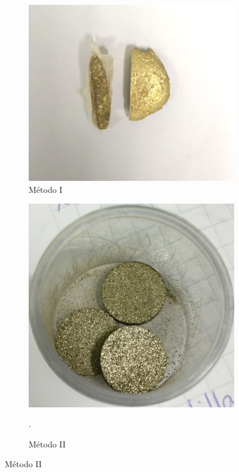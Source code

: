 \documentclass[a4paper,12pt,fleqn,twoside,openany]{book}
\begin{document}
\begin{figure}[h]
\begin{subfigure}{0.3\textwidth}
        \includegraphics[width=\textwidth]{Img/Procedimiento/boton.jpg}
        \caption{Método I}
        \label{fig:boton}
    \end{subfigure}
    \begin{subfigure}{0.25\textwidth}
        \includegraphics[width=\textwidth]{Img/Procedimiento/PastViruta.jpg}
	\caption{Método II}. 

\end{subfigure}
\end{figure}
\end{document}
